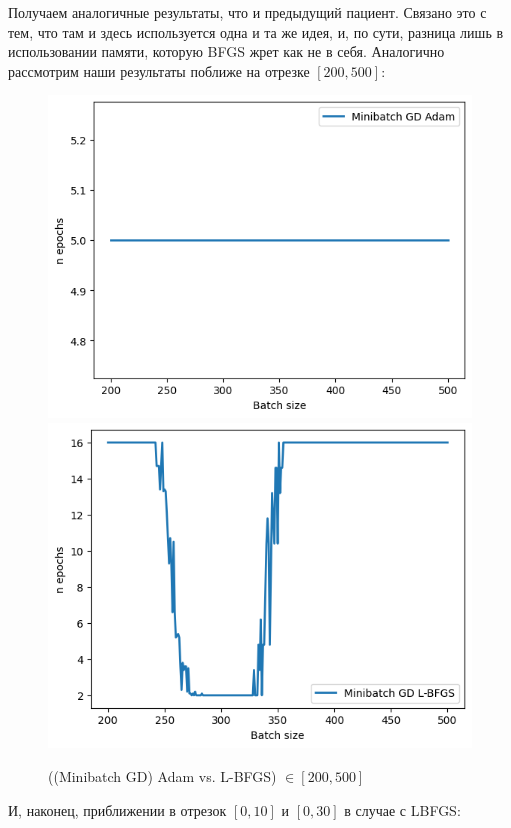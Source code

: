 \documentclass[12pt, a4paper, oneside, final]{article}
\begin{document}
	Получаем аналогичные результаты, что и предыдущий пациент.
	Связано это с тем, что там и здесь используется одна и та же идея, и, по сути, разница лишь в использовании памяти, которую BFGS жрет как не в себя.
	Аналогично рассмотрим наши результаты поближе на отрезке $[200, 500]$:
	\begin{figure}[H]
		\centering
		\includegraphics[scale = 0.75]{Image/T2_ADAM_200_500.png}
		\includegraphics[scale = 0.75]{Image/AT_LBFGS_200_500.png}
		\caption*{((Minibatch GD) Adam vs. L-BFGS) $\in [200, 500]$}
	\end{figure}
	И, наконец, приближении в отрезок $[0, 10]$ и $[0, 30]$ в случае с LBFGS:
\end{document}
